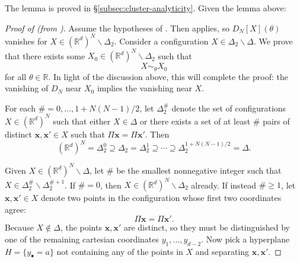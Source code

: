 \documentclass[11pt, letterpaper, reqno]{amsart}
\theoremstyle{definition}
\theoremstyle{remark}
\newcommand{\bbR}{\mathbb{R}}
\newcommand{\bfx}{\mathbf{x}}
\begin{document}
The lemma is proved in \S\ref{subsec:cluster-analyticity}. Given the lemma above:
\begin{proof}[Proof of  (from )]
Assume the hypotheses of . 
Then  applies, so $D_N[X](\theta)$ vanishes for $X\in (\bbR^d)^N\backslash \Delta_2$. 
Consider a configuration $X\in \Delta_2\backslash \Delta$.
We prove that there exists some $X_0 \in (\bbR^d)^N\backslash \Delta_2 $ such that 
\begin{equation}
    X\sim_\theta X_0 
\end{equation}
for all $\theta\in \bbR$. In light of the discussion above, this will complete the proof: the vanishing of $D_N$ near $X_0$ implies the vanishing near $X$. 

    For each $\#=0,\dots,1+N(N-1)/2$, let $\Delta_2^\#$ denote the set of configurations $X\in (\bbR^d)^N$ such that either $X\in \Delta$ or there exists a set of at least $\#$ pairs of distinct $\bfx,\bfx'\in X$ such that $\Pi \bfx=\Pi \bfx'$. Then 
    \begin{equation}
        (\bbR^d)^{N}=\Delta_2^0\supseteq \Delta_2=\Delta_2^1\supseteq \cdots \supseteq   \Delta_2^{1+N(N-1)/2}=\Delta  .
    \end{equation}

    Given $X\in (\bbR^d)^N\backslash \Delta$,
    let $\#$ be the smallest nonnegative integer such that $X\in \Delta_2^\#\backslash \Delta_2^{\#+1}$. 
    If $\#=0$, then $X\in (\bbR^d)^N\backslash \Delta_2$ already.
    If instead $\#\geq 1$, let $\bfx,\bfx'\in X$ denote two points in the configuration whose first two coordinates agree:
    \begin{equation}
        \Pi \bfx = \Pi \bfx'. 
    \end{equation}
    Because $X\notin \Delta$, the points $\bfx,\bfx'$ are distinct, so they must be distinguished by one of the remaining cartesian coordinates $y_1,\dots,y_{d-2}$. 
    Now pick a hyperplane $H=\{y_\bullet = a\}$ not containing any of the points in $X$ and separating $\bfx,\bfx'$.  


\end{proof}
\end{document}
